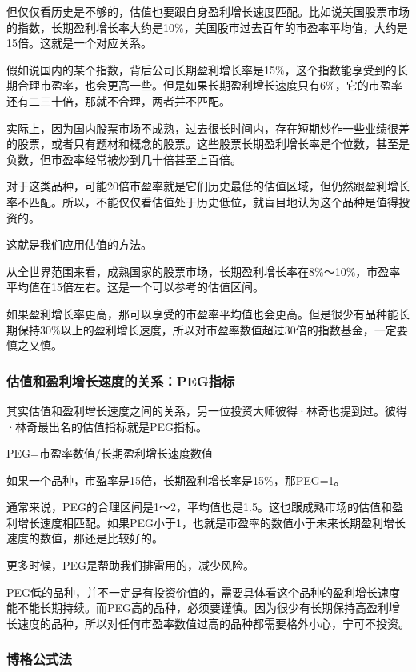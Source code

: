 但仅仅看历史是不够的，估值也要跟自身盈利增长速度匹配。比如说美国股票市场的指数，长期盈利增长率大约是10\%，美国股市过去百年的市盈率平均值，大约是15倍。这就是一个对应关系。

假如说国内的某个指数，背后公司长期盈利增长率是15\%，这个指数能享受到的长期合理市盈率，也会更高一些。但是如果长期盈利增长速度只有6\%，它的市盈率还有二三十倍，那就不合理，两者并不匹配。

实际上，因为国内股票市场不成熟，过去很长时间内，存在短期炒作一些业绩很差的股票，或者只有题材和概念的股票。这些股票长期盈利增长率是个位数，甚至是负数，但市盈率经常被炒到几十倍甚至上百倍。

对于这类品种，可能20倍市盈率就是它们历史最低的估值区域，但仍然跟盈利增长率不匹配。所以，不能仅仅看估值处于历史低位，就盲目地认为这个品种是值得投资的。

这就是我们应用估值的方法。

从全世界范围来看，成熟国家的股票市场，长期盈利增长率在8\%～10\%，市盈率平均值在15倍左右。这是一个可以参考的估值区间。

如果盈利增长率更高，那可以享受的市盈率平均值也会更高。但是很少有品种能长期保持30\%以上的盈利增长速度，所以对市盈率数值超过30倍的指数基金，一定要慎之又慎。

\subsubsection{估值和盈利增长速度的关系：PEG指标}

其实估值和盈利增长速度之间的关系，另一位投资大师彼得·林奇也提到过。彼得·林奇最出名的估值指标就是PEG指标。

{\kaishu PEG=市盈率数值/长期盈利增长速度数值}

如果一个品种，市盈率是15倍，长期盈利增长率是15\%，那PEG=1。

通常来说，PEG的合理区间是1～2，平均值也是1.5。这也跟成熟市场的估值和盈利增长速度相匹配。如果PEG小于1，也就是市盈率的数值小于未来长期盈利增长速度的数值，那还是比较好的。

更多时候，PEG是帮助我们排雷用的，减少风险。

PEG低的品种，并不一定是有投资价值的，需要具体看这个品种的盈利增长速度能不能长期持续。而PEG高的品种，必须要谨慎。因为很少有长期保持高盈利增长速度的品种，所以对任何市盈率数值过高的品种都需要格外小心，宁可不投资。

\subsubsection{博格公式法}

